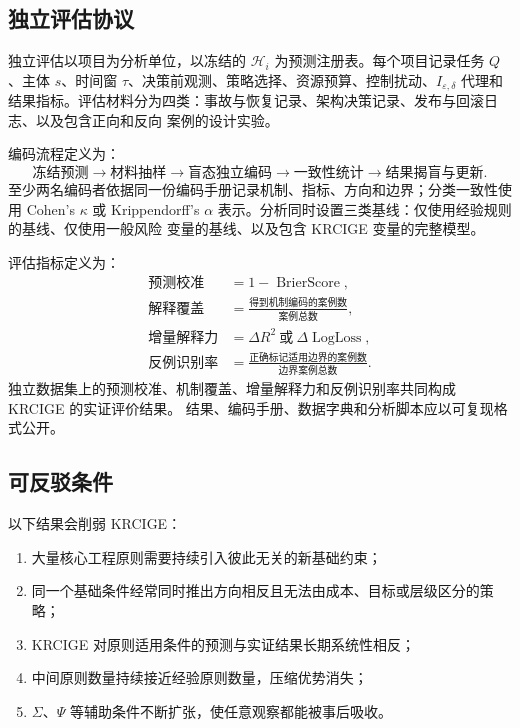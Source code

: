 \documentclass[11pt,a4paper]{ctexart}
\numberwithin{equation}{section}
\theoremstyle{definition}
\theoremstyle{plain}
\begin{document}
\subsection{独立评估协议}

独立评估以项目为分析单位，以冻结的 $\mathcal{H}_i$ 为预测注册表。每个项目记录任务 $Q$、主体
$s$、时间窗 $\tau$、决策前观测、策略选择、资源预算、控制扰动、$I_{\varepsilon,\delta}$ 代理和
结果指标。评估材料分为四类：事故与恢复记录、架构决策记录、发布与回滚日志、以及包含正向和反向
案例的设计实验。

编码流程定义为：
\[
\text{冻结预测}
\longrightarrow
\text{材料抽样}
\longrightarrow
\text{盲态独立编码}
\longrightarrow
\text{一致性统计}
\longrightarrow
\text{结果揭盲与更新}.
\]
至少两名编码者依据同一份编码手册记录机制、指标、方向和边界；分类一致性使用 Cohen's $\kappa$
或 Krippendorff's $\alpha$ 表示。分析同时设置三类基线：仅使用经验规则的基线、仅使用一般风险
变量的基线、以及包含 KRCIGE 变量的完整模型。

评估指标定义为：
\[
\begin{aligned}
\text{预测校准}&=1-\operatorname{BrierScore},\\
\text{解释覆盖}&=\frac{\text{得到机制编码的案例数}}{\text{案例总数}},\\
\text{增量解释力}&=\Delta R^2\ \text{或}\ \Delta\operatorname{LogLoss},\\
\text{反例识别率}&=\frac{\text{正确标记适用边界的案例数}}{\text{边界案例总数}}.
\end{aligned}
\]
独立数据集上的预测校准、机制覆盖、增量解释力和反例识别率共同构成 KRCIGE 的实证评价结果。
结果、编码手册、数据字典和分析脚本应以可复现格式公开。

\subsection{可反驳条件}

以下结果会削弱 KRCIGE：

\begin{enumerate}
    \item 大量核心工程原则需要持续引入彼此无关的新基础约束；
    \item 同一个基础条件经常同时推出方向相反且无法由成本、目标或层级区分的策略；
    \item KRCIGE 对原则适用条件的预测与实证结果长期系统性相反；
    \item 中间原则数量持续接近经验原则数量，压缩优势消失；
    \item $\Sigma$、$\Psi$ 等辅助条件不断扩张，使任意观察都能被事后吸收。
\end{enumerate}
\end{document}
